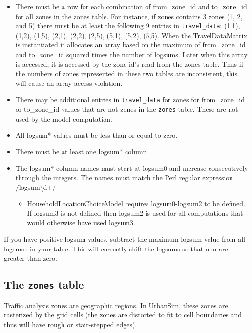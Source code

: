 \begin{itemize} \tight
\item There must be a row for each combination of from_zone_id and to_zone_id
for all zones in the zones table. For instance, if zones contains 3 zones (1,
2, and 5) there must be at least the following 9 entries in \verb|travel_data|:
(1,1), (1,2), (1,5), (2,1), (2,2), (2,5), (5,1), (5,2), (5,5). When the
TravelDataMatrix is instantiated it allocates an array based on the maximum of
from_zone_id and to_zone_id squared times the number of logsums. Later when
this array is accessed, it is accessed by the zone id's read from the zones
table. Thus if the numbers of zones represented in these two tables are
inconsistent, this will cause an array access violation.
\item There may be additional entries in \verb|travel_data| for zones for
from_zone_id or to_zone_id values that are not zones in the \verb|zones| table.
These are not used by the model computation.
\item All logsum* values must be less than or equal to zero.
\item There must be at least one logsum* column
\item The logsum* column names must start at logsum0 and increase consecutively
through the integers. The names must match the Perl regular expression
/logsum\textbackslash d+/ \begin{itemize} \tight
\item HouseholdLocationChoiceModel requires logsum0-logsum2 to be defined. If
logsum3 is not defined then logsum2 is used for all computations that would
otherwise have used logsum3.

\end{itemize}


\end{itemize}


If you have positive logsum values, subtract the maximum logsum value from all
logsums in your table. This will correctly shift the logsums so that non are
greater than zero.

\subsection{The {\tt zones} table}

Traffic analysis zones are geographic regions. In UrbanSim, these zones are
rasterized by the grid cells (the zones are distorted to fit to cell boundaries
and thus will have rough or stair-stepped edges).

